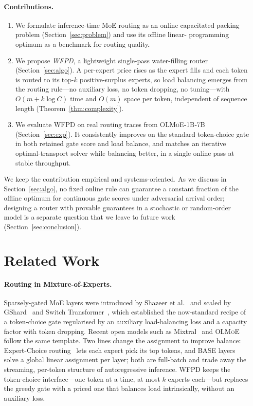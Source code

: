 \documentclass[preprint,12pt]{elsarticle}
\theoremstyle{plain}
\theoremstyle{remark}
\begin{document}
\paragraph{Contributions.}
\begin{enumerate}
\item We formulate inference-time MoE routing as an online capacitated
packing problem (Section~\ref{sec:problem}) and use its offline linear-%
programming optimum as a benchmark for routing quality.
\item We propose \emph{WFPD}, a lightweight single-pass water-filling router
(Section~\ref{sec:algo}). A per-expert price rises as the expert fills and
each token is routed to its top-$k$ positive-surplus experts, so load
balancing emerges from the routing rule---no auxiliary loss, no token
dropping, no tuning---with $O(m+k\log C)$ time and $O(m)$ space per token,
independent of sequence length (Theorem~\ref{thm:complexity}).
\item We evaluate WFPD on real routing traces from
\textsc{OLMoE-1B-7B} (Section~\ref{sec:exp}). It consistently improves on
the standard token-choice gate in both retained gate score and load
balance, and matches an iterative optimal-transport solver while balancing
better, in a single online pass at stable throughput.
\end{enumerate}

We keep the contribution empirical and systems-oriented. As we discuss in
Section~\ref{sec:algo}, no fixed online rule can guarantee a constant
fraction of the offline optimum for continuous gate scores under
adversarial arrival order; designing a router with provable guarantees in a
stochastic or random-order model is a separate question that we leave to
future work (Section~\ref{sec:conclusion}).

\section{Related Work}
\label{sec:related}

\paragraph{Routing in Mixture-of-Experts.}
Sparsely-gated MoE layers were introduced by Shazeer et
al.~\cite{shazeer2017} and scaled by GShard~\cite{gshard} and Switch
Transformer~\cite{switch}, which established the now-standard recipe of a
token-choice gate regularised by an auxiliary load-balancing loss and a
capacity factor with token dropping. Recent open models such as
Mixtral~\cite{mixtral} and \textsc{OLMoE}~\cite{olmoe} follow the same
template. Two lines change the assignment to improve balance:
Expert-Choice routing~\cite{expertchoice} lets each expert pick its top
tokens, and \textsc{BASE} layers~\cite{baselayers} solve a global linear
assignment per layer; both are full-batch and trade away the streaming,
per-token structure of autoregressive inference. WFPD keeps the
token-choice interface---one token at a time, at most $k$ experts each---but
replaces the greedy gate with a priced one that balances load
intrinsically, without an auxiliary loss.
\end{document}
